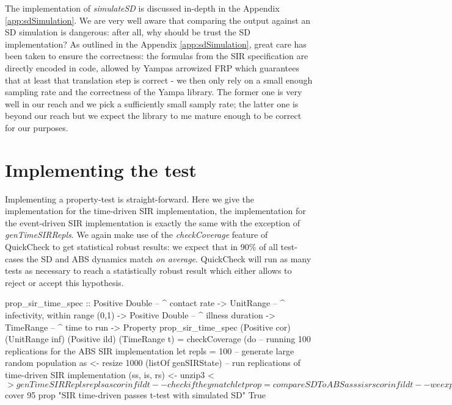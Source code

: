 The implementation of \textit{simulateSD} is discussed in-depth in the Appendix \ref{app:sdSimulation}. We are very well aware that comparing the output against an SD simulation is dangerous: after all, why should be trust the SD implementation? As outlined in the Appendix \ref{app:sdSimulation}, great care has been taken to ensure the correctness: the formulas from the SIR specification are directly encoded in code, allowed by Yampas arrowized FRP which guarantees that at least that translation step is correct - we then only rely on a small enough sampling rate and the correctness of the Yampa library. The former one is very well in our reach and we pick a sufficiently small samply rate; the latter one is beyond our reach but we expect the library to me mature enough to be correct for our purposes.

\section{Implementing the test}
Implementing a property-test is straight-forward. Here we give the implementation for the time-driven SIR implementation, the implementation for the event-driven SIR implementation is exactly the same with the exception of \textit{genTimeSIRRepls}. We again make use of the \textit{checkCoverage} feature of QuickCheck to get statistical robust results: we expect that in 90\% of all test-cases the SD and ABS dynamics match \textit{on average}. QuickCheck will run as many tests as necessary to reach a statistically robust result which either allows to reject or accept this hypothesis.

\begin{HaskellCode}
prop_sir_time_spec :: Positive Double  -- ^ contact rate
                   -> UnitRange        -- ^ infectivity, within range (0,1)
                   -> Positive Double  -- ^ illness duration
                   -> TimeRange        -- ^ time to run
                   -> Property
prop_sir_time_spec 
    (Positive cor) (UnitRange inf) (Positive ild) (TimeRange t) = checkCoverage (do
  -- running 100 replications for the ABS SIR implementation
  let repls = 100
  -- generate large random population
  as <- resize 1000 (listOf genSIRState)
  -- run replications of time-driven SIR implementation
  (ss, is, rs) <- unzip3 <$> genTimeSIRRepls repls as cor inf ild t
  -- check if they match 
  let prop = compareSDToABS as ss is rs cor inf ild t
  -- we expect 95%
  return $ cover 95 prop "SIR time-driven passes t-test with simulated SD" True
\end{HaskellCode}


